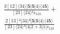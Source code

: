 \documentclass[varwidth, border=5pt]{standalone}
\begin{document}
\begin{my}
$\begin{gathered}
\scriptscriptstyle\frac{3[12]⟨34⟩[𝟓|𝟓|4⟩⟨4𝟓⟩}{[23]⟨24⟩²s_{123}} +\\
\scriptscriptstyle\frac{2[13]²⟨34⟩³[𝟓|𝟓|4⟩⟨4𝟓⟩}{[23]⟨24⟩³⟨4|2+3|1]s_{123}} \phantom{+}
\end{gathered}$
\end{my}
\end{document}
